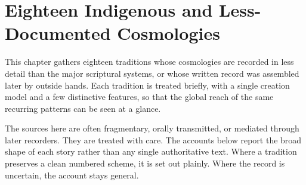 \chapter{Eighteen Indigenous and Less-Documented Cosmologies}

This chapter gathers eighteen traditions whose cosmologies are recorded in less detail than the major scriptural systems, or whose written record was assembled later by outside hands. Each tradition is treated briefly, with a single creation model and a few distinctive features, so that the global reach of the same recurring patterns can be seen at a glance.

The sources here are often fragmentary, orally transmitted, or mediated through later recorders. They are treated with care. The accounts below report the broad shape of each story rather than any single authoritative text. Where a tradition preserves a clean numbered scheme, it is set out plainly. Where the record is uncertain, the account stays general.
